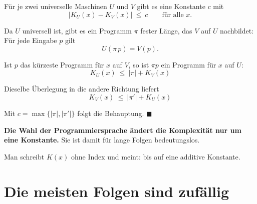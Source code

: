 \begin{merksatz}
Für je zwei universelle Maschinen $U$ und $V$ gibt es eine Konstante $c$ mit
\[ \bigl|K_U(x) - K_V(x)\bigr| \ \le\ c \qquad\text{für alle } x . \]

Da $U$ universell ist, gibt es ein Programm $\pi$ fester Länge, das $V$ auf $U$ nachbildet: Für jede Eingabe $p$ gilt
\[ U(\pi\,p) = V(p) . \]

Ist $p$ das kürzeste Programm für $x$ auf $V$, so ist $\pi p$ ein Programm für $x$ auf $U$:
\[ K_U(x) \ \le\ |\pi| + K_V(x) \]

Dieselbe Überlegung in die andere Richtung liefert
\[ K_V(x) \ \le\ |\pi'| + K_U(x) \]

Mit $c = \max\{|\pi|,|\pi'|\}$ folgt die Behauptung. $\blacksquare$

\begin{center}
\begin{minipage}{0.9\textwidth}
\textbf{Die Wahl der Programmiersprache ändert die Komplexität nur um eine Konstante.} Sie ist damit für lange Folgen bedeutungslos.
\end{minipage}
\end{center}

\begin{center}
\begin{minipage}{0.88\textwidth}
\end{minipage}
\end{center}

Man schreibt $K(x)$ ohne Index und meint: bis auf eine additive Konstante.
\end{merksatz}

\section{Die meisten Folgen sind zufällig}

